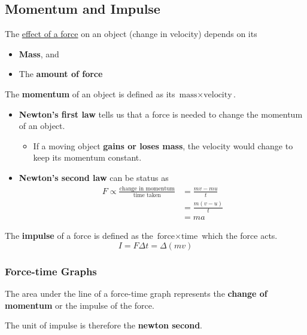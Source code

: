 \subsection{Momentum and Impulse}

The \underline{effect of a force} on an object (change in velocity) depends on its
\begin{itemize}
    \item \textbf{Mass}, and
    \item The \textbf{amount of force}
\end{itemize}
The \textbf{momentum} of an object is defined as its $\text{mass}\times\text{velocity}$.

\begin{itemize}
    \item \textbf{Newton's first law} tells us that a force is needed to change the momentum of an object.
        \begin{itemize}
            \item If a moving object \textbf{gains or loses mass}, the velocity would change to keep its momentum constant.
        \end{itemize}
    \item \textbf{Newton's second law} can be status as
        \begin{align*}
            F\propto\frac{\text{change in momentum}}{\text{time taken}}&=\frac{mv-mu}{t}\\
                                                                       &=\frac{m(v-u)}{t}\\
                                                                       &=ma
        \end{align*}
\end{itemize}

The \textbf{impulse} of a force is defined as the $\text{force}\times\text{time}$ which the force acts.
$$I=F\Delta t=\Delta(mv)$$

\subsubsection*{Force-time Graphs}

The area under the line of a force-time graph represents the \textbf{change of momentum} or the impulse of the force.

The unit of impulse is therefore the \textbf{newton second}.
